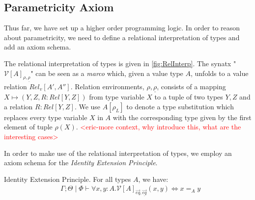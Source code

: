 \documentclass[acmsmall]{acmart}
\newcommand{\eric}[1]{\textcolor{red}{ <eric-#1> }}
\begin{document}




\subsection{Parametricity Axiom}
Thus far, we have set up a higher order programming logic. In order to reason about parametricity, we need to define a relational interpretation of types and add an axiom schema.

The relational interpretation of types is given in \cref{fig:RelInterp}. The synatx "$\mathcal{V}[A]_{\rho,\underline{\rho}}$"  can be seen as a \textit{marco} which, given a value type $A$, unfolds to a value relation $Rel_v[A',A'']$. Relation environments, $\rho,\underline{\rho}$, consists of a mapping $X\mapsto (Y,Z,R : Rel[Y,Z])$ from type variable $X$ to a tuple of two types $Y,Z$ and a relation $R : Rel[Y,Z]$. We use $A[\rho_L]$ to denote a type substitution which replaces every type variable $X$ in $A$ with the corresponding type given by the first element of tuple $\rho(X)$. \eric{more context, why introduce this, what are the interesting cases}

In order to make use of the relational interpretation of types, we employ an axiom schema for the \textit{Identity Extension Principle}.

\begin{definition}
  Identity Extension Principle. For all types $A$, we have:
  \begin{align*}
    &  \Gamma ; \Theta \;|\; \Phi \vdash \forall x,y : A. \mathcal{V}[A]_{\overrightarrow{eq},\underline{\overrightarrow{eq}}}(x,y) \iff x =_A y  \\ 
  \end{align*}
\end{definition}
\end{document}
